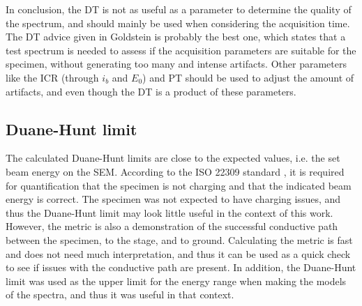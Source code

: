 In conclusion, the DT is not as useful as a parameter to determine the quality of the spectrum, and should mainly be used when considering the acquisition time.
The DT advice given in Goldstein is probably the best one, which states that a test spectrum is needed to assess if the acquisition parameters are suitable for the specimen, without generating too many and intense artifacts.
Other parameters like the ICR (through $i_b$ and $E_0$) and PT should be used to adjust the amount of artifacts, and even though the DT is a product of these parameters.



\subsection{Duane-Hunt limit}
\label{discussion:duane_hunt}

The calculated Duane-Hunt limits are close to the expected values, i.e. the set beam energy on the SEM.
According to the ISO 22309 standard \cite{iso_quantification_22309}, it is required for quantification that the specimen is not charging and that the indicated beam energy is correct.
The specimen was not expected to have charging issues, and thus the Duane-Hunt limit may look little useful in the context of this work.
However, the metric is also a demonstration of the successful conductive path between the specimen, to the stage, and to ground.
Calculating the metric is fast and does not need much interpretation, and thus it can be used as a quick check to see if issues with the conductive path are present.
In addition, the Duane-Hunt limit was used as the upper limit for the energy range when making the models of the spectra, and thus it was useful in that context.

